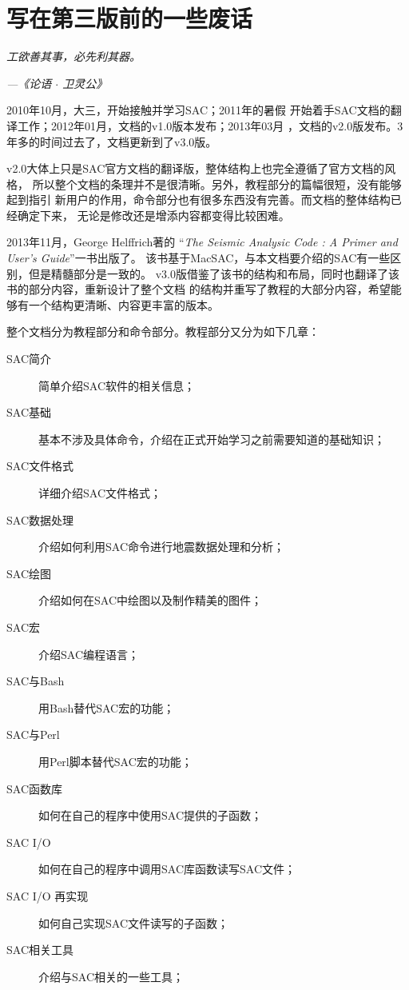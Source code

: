 \section*{\centering 写在第三版前的一些废话}

\begin{shadequote*}
\Large\emph{
工欲善其事，必先利其器。
}
\par\hfill\emph{\normalsize---《论语 $\cdot$ 卫灵公》}
\end{shadequote*}

2010年10月，大三，开始接触并学习SAC；2011年的暑假
开始着手SAC文档的翻译工作；2012年01月，文档的v1.0版本发布；2013年03月
，文档的v2.0版发布。3年多的时间过去了，文档更新到了v3.0版。

v2.0大体上只是SAC官方文档的翻译版，整体结构上也完全遵循了官方文档的风格，
所以整个文档的条理并不是很清晰。另外，教程部分的篇幅很短，没有能够起到指引
新用户的作用，命令部分也有很多东西没有完善。而文档的整体结构已经确定下来，
无论是修改还是增添内容都变得比较困难。

2013年11月，George Helffrich著的
``\emph{The Seismic Analysic Code : A Primer and User's Guide}''一书出版了。
该书基于MacSAC，与本文档要介绍的SAC有一些区别，但是精髓部分是一致的。
v3.0版借鉴了该书的结构和布局，同时也翻译了该书的部分内容，重新设计了整个文档
的结构并重写了教程的大部分内容，希望能够有一个结构更清晰、内容更丰富的版本。

整个文档分为教程部分和命令部分。教程部分又分为如下几章：
\begin{description}
\item[SAC简介] 简单介绍SAC软件的相关信息；
\item[SAC基础] 基本不涉及具体命令，介绍在正式开始学习之前需要知道的基础知识；
\item[SAC文件格式] 详细介绍SAC文件格式；
\item[SAC数据处理] 介绍如何利用SAC命令进行地震数据处理和分析；
\item[SAC绘图] 介绍如何在SAC中绘图以及制作精美的图件；
\item[SAC宏] 介绍SAC编程语言；
\item[SAC与Bash] 用Bash替代SAC宏的功能；
\item[SAC与Perl] 用Perl脚本替代SAC宏的功能；
\item[SAC函数库] 如何在自己的程序中使用SAC提供的子函数；
\item[SAC I/O] 如何在自己的程序中调用SAC库函数读写SAC文件；
\item[SAC I/O 再实现] 如何自己实现SAC文件读写的子函数；
\item[SAC相关工具] 介绍与SAC相关的一些工具；
\end{description}

